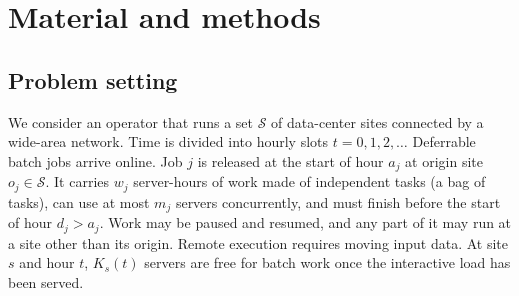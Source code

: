 \section{Material and methods}\label{sec:methods}

\subsection{Problem setting}\label{sec:problem}

We consider an operator that runs a set $\mathcal{S}$ of data-center sites connected by a wide-area network. Time is divided into hourly slots $t=0,1,2,\dots$ Deferrable batch jobs arrive online. Job $j$ is released at the start of hour $a_j$ at origin site $o_j\in\mathcal{S}$. It carries $w_j$ server-hours of work made of independent tasks (a bag of tasks), can use at most $m_j$ servers concurrently, and must finish before the start of hour $d_j>a_j$. Work may be paused and resumed, and any part of it may run at a site other than its origin. Remote execution requires moving input data. At site $s$ and hour $t$, $K_s(t)$ servers are free for batch work once the interactive load has been served.

